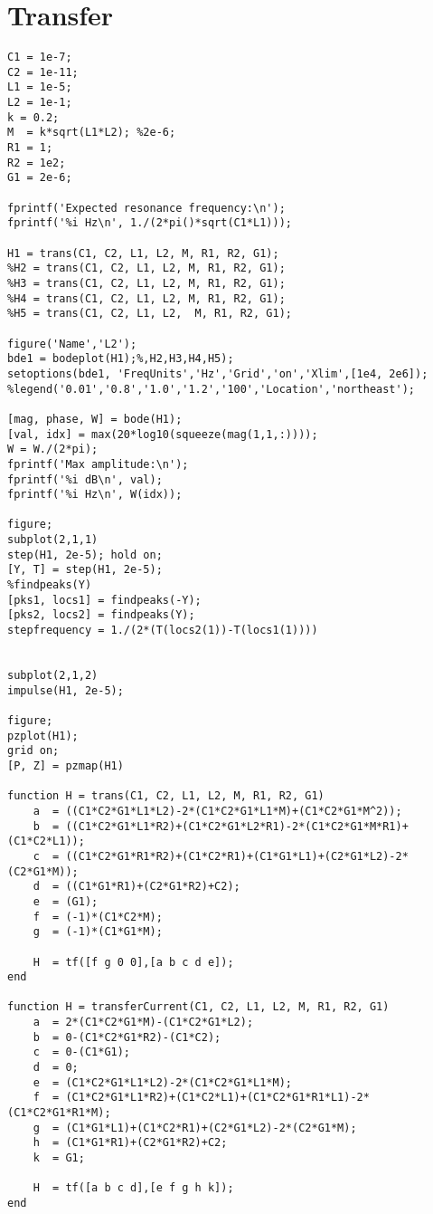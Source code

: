\section{Transfer}
\begin{lstlisting}
C1 = 1e-7;
C2 = 1e-11;
L1 = 1e-5;
L2 = 1e-1;
k = 0.2;
M  = k*sqrt(L1*L2); %2e-6;
R1 = 1;
R2 = 1e2;
G1 = 2e-6;

fprintf('Expected resonance frequency:\n');
fprintf('%i Hz\n', 1./(2*pi()*sqrt(C1*L1)));

H1 = trans(C1, C2, L1, L2, M, R1, R2, G1);
%H2 = trans(C1, C2, L1, L2, M, R1, R2, G1);
%H3 = trans(C1, C2, L1, L2, M, R1, R2, G1);
%H4 = trans(C1, C2, L1, L2, M, R1, R2, G1);
%H5 = trans(C1, C2, L1, L2,  M, R1, R2, G1);

figure('Name','L2');
bde1 = bodeplot(H1);%,H2,H3,H4,H5);
setoptions(bde1, 'FreqUnits','Hz','Grid','on','Xlim',[1e4, 2e6]);
%legend('0.01','0.8','1.0','1.2','100','Location','northeast');

[mag, phase, W] = bode(H1);
[val, idx] = max(20*log10(squeeze(mag(1,1,:))));
W = W./(2*pi);
fprintf('Max amplitude:\n');
fprintf('%i dB\n', val);
fprintf('%i Hz\n', W(idx));

figure;
subplot(2,1,1)
step(H1, 2e-5); hold on;
[Y, T] = step(H1, 2e-5);
%findpeaks(Y)
[pks1, locs1] = findpeaks(-Y);
[pks2, locs2] = findpeaks(Y);
stepfrequency = 1./(2*(T(locs2(1))-T(locs1(1))))


subplot(2,1,2)
impulse(H1, 2e-5);

figure;
pzplot(H1);
grid on;
[P, Z] = pzmap(H1)

function H = trans(C1, C2, L1, L2, M, R1, R2, G1)
    a  = ((C1*C2*G1*L1*L2)-2*(C1*C2*G1*L1*M)+(C1*C2*G1*M^2));
    b  = ((C1*C2*G1*L1*R2)+(C1*C2*G1*L2*R1)-2*(C1*C2*G1*M*R1)+(C1*C2*L1));
    c  = ((C1*C2*G1*R1*R2)+(C1*C2*R1)+(C1*G1*L1)+(C2*G1*L2)-2*(C2*G1*M));
    d  = ((C1*G1*R1)+(C2*G1*R2)+C2);
    e  = (G1);
    f  = (-1)*(C1*C2*M);
    g  = (-1)*(C1*G1*M);

    H  = tf([f g 0 0],[a b c d e]);
end

function H = transferCurrent(C1, C2, L1, L2, M, R1, R2, G1)
    a  = 2*(C1*C2*G1*M)-(C1*C2*G1*L2);
    b  = 0-(C1*C2*G1*R2)-(C1*C2);
    c  = 0-(C1*G1);
    d  = 0;
    e  = (C1*C2*G1*L1*L2)-2*(C1*C2*G1*L1*M);
    f  = (C1*C2*G1*L1*R2)+(C1*C2*L1)+(C1*C2*G1*R1*L1)-2*(C1*C2*G1*R1*M);
    g  = (C1*G1*L1)+(C1*C2*R1)+(C2*G1*L2)-2*(C2*G1*M);
    h  = (C1*G1*R1)+(C2*G1*R2)+C2;
    k  = G1;

    H  = tf([a b c d],[e f g h k]);
end
\end{lstlisting}

